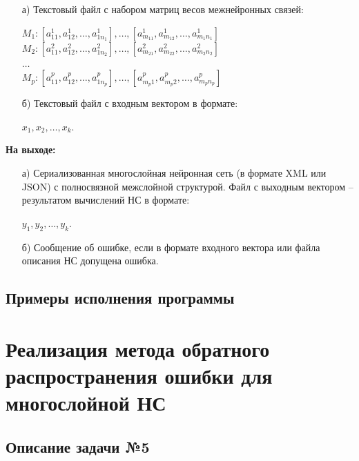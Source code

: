 \documentclass[bachelor, och, otchet]{template}
\begin{document}
    \begin{itemize}
        \item[а)] Текстовый файл с набором матриц весов межнейронных связей:
        \begin{center}
            $M_1 : [a_{11}^1, a_{12}^1, \dots, a_{1n_1}^1], \dots, [a_{m_11}^1, a_{m_12}^1, \dots ,a_{m_1n_1}^1]$ \\
            $M_2 : [a_{11}^2, a_{12}^2, \dots, a_{1n_2}^2], \dots, [a_{m_21}^2, a_{m_22}^2, \dots ,a_{m_2n_2}^2]$\\
            $\dots$\\
            $M_p : [a_{11}^p, a_{12}^p, \dots, a_{1n_p}^p], \dots, [a_{m_p1}^p, a_{m_p2}^p, \dots,a_{m_pn_p}^p]$ \\                  
        \end{center}
        \item[б)] Текстовый файл с входным вектором в формате:
        
        \begin{center}
            $x_1, x_2, \dots, x_k$.
        \end{center}
    \end{itemize}

    \textbf{На выходе:}
        \begin{itemize}
            \item[а)] Сериализованная многослойная нейронная сеть (в формате XML или JSON) с полносвязной межслойной структурой. 
            Файл с выходным вектором -- результатом вычислений НС в формате: 
            \begin{center}
                $y_1, y_2, \dots, y_k.$                
            \end{center}
            \item[б)] Сообщение об ошибке, если в формате входного вектора или файла описания НС допущена 
            ошибка.
        \end{itemize}
        

\subsection{Примеры исполнения программы}


\section{Реализация метода обратного распространения ошибки для многослойной НС}

    \subsection{Описание задачи №5}
\end{document}
